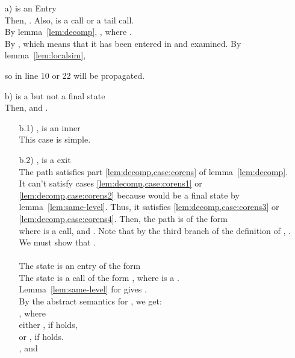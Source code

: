 \documentclass{LMCS}
\theoremstyle{definition} \newtheorem{property}[thm]{Property}
\begin{document}
\begin{enumerate}[]
\item[a)]
  \astat{} is an Entry \\
  Then, .
  Also,  is a call or a tail call. \\
  By lemma~\ref{lem:decomp}, , 
  where . \\
  By \ih,  which means that it 
  has been entered in \work{} and examined.
  By lemma~\ref{lem:localsim}, 
  
  so in line 10 or 22  will be propagated.
\item[b)]
  \newcommand{\qcallp}{\ensuremath{\tw{(}q \, e\tw{)}^{\gamma'}}}
  \newcommand{\ulamone}{\ensuremath{\tw{(}\lambda_{l_1}\tw{(}u_1\,k_1\tw{)}\,\mcall_1\tw{)}}}
  \newcommand{\ucalltwo}{\ensuremath{\tw{(}f_2 \: e_2 \: q_2\tw{)}^{l_2}}}
\astat{} is a \dacapply{} but not a final state \\
  Then,  
  and .
  \begin{enumerate}[]
  \item[b.1)]
    , \ie{}  is an inner \daceval \\
    This case is simple.
  \item[b.2)]
    , \ie{}  is a \daceval{} exit \\
    The path  satisfies part
    \ref{lem:decomp,case:corens} of lemma~\ref{lem:decomp}.
    It can't satisfy cases
    \ref{lem:decomp,case:corens1} or \ref{lem:decomp,case:corens2}
    because \astat{} would be a final state by lemma~\ref{lem:same-level}.
    Thus, it satisfies 
    \ref{lem:decomp,case:corens3} or \ref{lem:decomp,case:corens4}.
    Then, the path is of the form 
     \\
    where \astatw{} is a call, 
    and . 
    Note that by the third branch of the definition of \dcoren{},
    .
    We must show that . 
    \\ \\
    The state \astato{} is an entry of the form 
     \\
    The state \astatw{} is a call of the form 
    ,
    where  is a \mclam{}. \\
    Lemma~\ref{lem:same-level} for  gives
    .\\
    By the abstract semantics for , we get:\\
    , where 
\\
    either , if  holds,\\
    or ,
    if  holds. \\
    \ie{} , and \\

\end{enumerate}
\end{enumerate}
\end{document}
